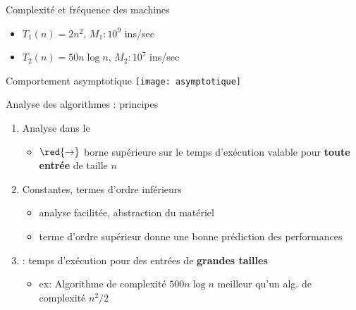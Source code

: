 \begin{frame}{Complexité et fréquence des machines}
  \begin{itemize}
  \item $T_1(n) = 2n^2$, $M_1: 10^9$ ins/sec
  \item $T_2(n) = 50n\log{}n$, $M_2: 10^7$ ins/sec
  \end{itemize}
\end{frame}

\begin{frame}{Comportement asymptotique}
   \texttt{[image: asymptotique]}
\end{frame}

\begin{frame}{Analyse des algorithmes : principes}
  \begin{enumerate}
  \item Analyse dans le  \\
    \begin{itemize}
    \item[] $\red{\mathbf{\rightarrow}}$ borne supérieure sur le temps d'exécution valable pour \textbf{toute entrée} de taille $n$ 
    \end{itemize}
  \item Constantes, termes d'ordre inférieurs 
    \begin{itemize}
    \item analyse facilitée, abstraction du matériel
    \item terme d'ordre supérieur donne une bonne prédiction des performances 
    \end{itemize}
  \item {} : temps d'exécution pour des entrées de \textbf{grandes tailles}
    \begin{itemize}
    \item ex: Algorithme de complexité $500n\log n$ meilleur qu'un alg. de complexité  $n^2/2$ 
    \end{itemize}
  \end{enumerate}
\end{frame}

